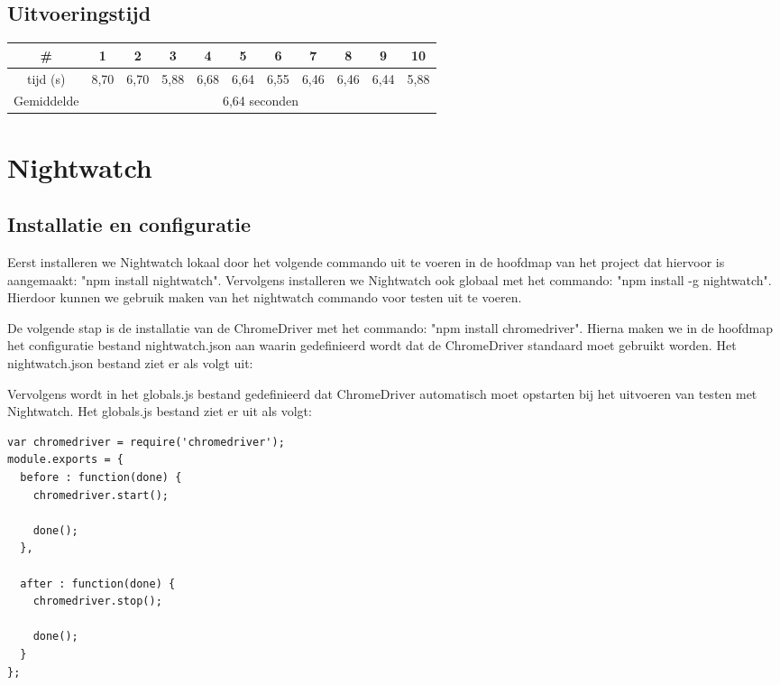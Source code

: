 \subsection{Uitvoeringstijd}

\begin{center}
\begin{tabular}{ |c| |c |c |c |c |c |c |c |c |c |c| }
\hline
	\# & 1 & 2 & 3 & 4 & 5 & 6 & 7 & 8 & 9 & 10\\
\hline
	tijd (s) & 8,70 & 6,70 & 5,88 & 6,68 & 6,64 & 6,55 & 6,46 & 6,46 & 6,44 & 5,88\\
\hline
 Gemiddelde & \multicolumn{10}{c|}{6,64 seconden}\\
\hline
\end{tabular}
\end{center}

\section{Nightwatch}
\subsection{Installatie en configuratie}
Eerst installeren we Nightwatch lokaal door het volgende commando uit te voeren in de hoofdmap van het project dat hiervoor is aangemaakt: "npm install nightwatch". Vervolgens installeren we Nightwatch ook globaal met het commando: "npm install -g nightwatch". Hierdoor kunnen we gebruik maken van het nightwatch commando voor testen uit te voeren.

De volgende stap is de installatie van de ChromeDriver met het commando: "npm install chromedriver". Hierna maken we in de hoofdmap het configuratie bestand nightwatch.json aan waarin gedefinieerd wordt dat de ChromeDriver standaard moet gebruikt worden. Het nightwatch.json bestand ziet er als volgt uit:


Vervolgens wordt in het globals.js bestand gedefinieerd dat ChromeDriver automatisch moet opstarten bij het uitvoeren van testen met Nightwatch. Het globals.js bestand ziet er uit als volgt: 
\begin{lstlisting}
var chromedriver = require('chromedriver');
module.exports = {
  before : function(done) {
    chromedriver.start();

    done();
  },

  after : function(done) {
    chromedriver.stop();

    done();
  }
};  
\end{lstlisting}

